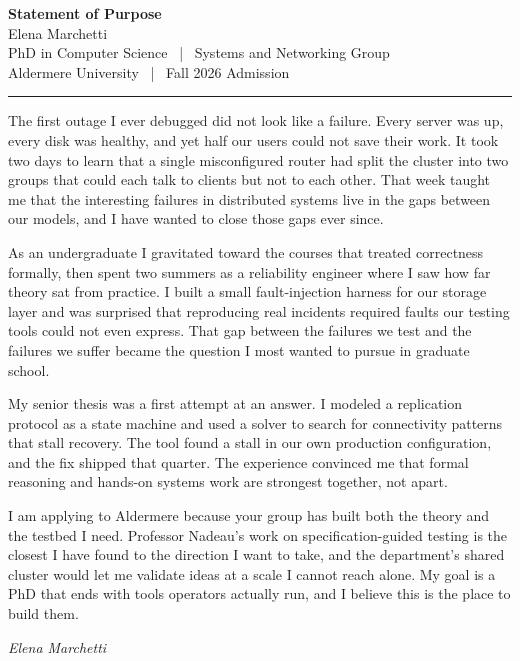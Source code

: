 \documentclass[11pt]{article}
\begin{document}
\begin{center}
  {\LARGE\bfseries Statement of Purpose}\\[0.5em]
  {\large\color{accent} Elena Marchetti}\\[0.3em]
  {\normalsize PhD in Computer Science \, | \, Systems and Networking Group}\\[0.2em]
  {\small Aldermere University \, | \, Fall 2026 Admission}
\end{center}

\vspace{0.4em}
{\color{accent}\rule{\textwidth}{0.8pt}}
\vspace{0.8em}

\noindent The first outage I ever debugged did not look like a failure. Every
server was up, every disk was healthy, and yet half our users could not save
their work. It took two days to learn that a single misconfigured router had
split the cluster into two groups that could each talk to clients but not to
each other. That week taught me that the interesting failures in distributed
systems live in the gaps between our models, and I have wanted to close those
gaps ever since.

As an undergraduate I gravitated toward the courses that treated correctness
formally, then spent two summers as a reliability engineer where I saw how far
theory sat from practice. I built a small fault-injection harness for our storage
layer and was surprised that reproducing real incidents required faults our
testing tools could not even express. That gap between the failures we test and
the failures we suffer became the question I most wanted to pursue in graduate
school.

My senior thesis was a first attempt at an answer. I modeled a replication
protocol as a state machine and used a solver to search for connectivity patterns
that stall recovery. The tool found a stall in our own production configuration,
and the fix shipped that quarter. The experience convinced me that formal
reasoning and hands-on systems work are strongest together, not apart.

I am applying to Aldermere because your group has built both the theory and the
testbed I need. Professor Nadeau's work on specification-guided testing is the
closest I have found to the direction I want to take, and the department's
shared cluster would let me validate ideas at a scale I cannot reach alone. My
goal is a PhD that ends with tools operators actually run, and I believe this is
the place to build them.

\vspace{0.6em}
\noindent\hfill{\itshape Elena Marchetti}
\end{document}
